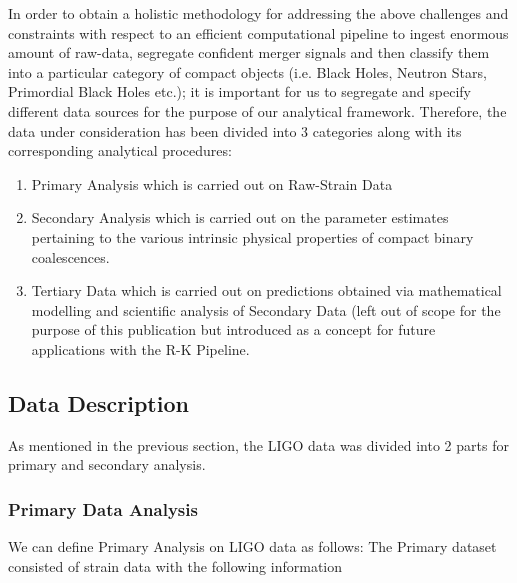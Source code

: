     In order to obtain a holistic methodology for addressing the above challenges and constraints with respect to an efficient computational pipeline to ingest enormous amount of raw-data, segregate confident merger signals and then classify them into a particular category of compact objects (i.e. Black Holes, Neutron Stars, Primordial Black Holes etc.); it is important for us to segregate and specify different data sources for the purpose of our analytical framework. Therefore, the data under consideration has been divided into 3 categories along with its corresponding analytical procedures:
    \begin{enumerate}
        \item Primary Analysis which is carried out on Raw-Strain Data
        \item Secondary Analysis which is carried out on the parameter estimates pertaining to the various  intrinsic physical properties of compact binary coalescences.
        \item Tertiary Data which is carried out on predictions obtained via mathematical modelling and scientific analysis of Secondary Data (left out of scope for the purpose of this publication but introduced as a concept for future applications with the R-K Pipeline.
        
    \end{enumerate}

    \subsection{Data Description}
    As mentioned in the previous section, the LIGO data was divided into 2 parts for primary and secondary analysis.

    \subsubsection{Primary Data Analysis}

    We can define Primary Analysis on LIGO data as follows:
    The Primary dataset consisted of strain data with the following information

